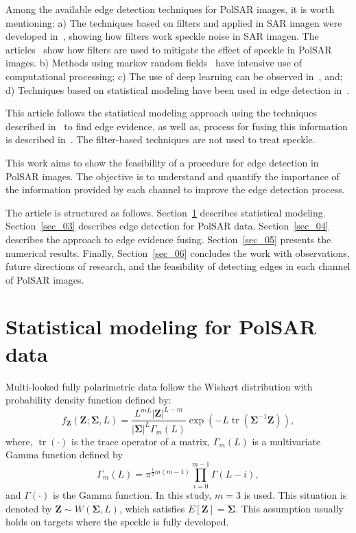 \documentclass[journal]{IEEEtran}
\DeclareMathOperator{\traco}{tr}
\begin{document}
Among the available edge detection techniques for PolSAR images, it is worth mentioning:
a) The techniques based on filters and applied in SAR imagen were developed in~\cite{tlb, obw, flmc}, showing how filters work speckle noise in SAR imagen. The articles~\cite{sjx, lzly, wxbzw, law, cgaf} show how filters are used to mitigate the effect of speckle in PolSAR images.   
b) Methods using markov random fields~\cite{bf} have intensive use of computational processing;
c) The use of deep learning can be observed in~\cite{bac, ztmxzxf}, and;
d) Techniques based on statistical modeling have been used in edge detection in~\cite{gmbf, fbgm, horrit}.

This article follows the statistical modeling approach using the techniques described in~\cite{fbgm, nhfc, bmf_2019} to find edge evidence, as well as, process for fusing this information is described in~\cite{mit, sg}. The filter-based techniques are not used to treat speckle. 

This work aims to show the feasibility of a procedure for edge detection in PolSAR images. The objective is to understand and quantify the importance of the information provided by each channel to improve the edge detection process.

The article is structured as follows.
Section~\ref{sec_02} describes statistical modeling.
Section~\ref{sec_03} describes edge detection for PolSAR data.
Section~\ref{sec_04} describes the approach to edge evidence fusing.
Section~\ref{sec_05} presents the numerical results.
Finally, Section~\ref{sec_06} concludes the work with observations, future directions of research, and the feasibility of detecting edges in each channel of PolSAR images.

\section{Statistical modeling for PolSAR data}\label{sec_02}
Multi-looked fully polarimetric data follow the Wishart distribution with probability density function defined by:
\begin{equation}
    f_{\mathbf{Z}}(\mathbf{Z};\mathbf{\Sigma},L)=\frac{L^{mL}|\mathbf{Z}|^{L-m}}{|\mathbf{\Sigma}|^{L}\Gamma_m(L)} \exp(-L\traco(\mathbf{\Sigma}^{-1}\mathbf{Z})),
    \label{eq_04}
\end{equation} 
where, $\traco(\cdot)$ is the trace operator of a matrix, $\Gamma_m(L)$ is a multivariate Gamma function defined by
\begin{equation*}
	\Gamma_m(L)=\pi^{\frac{1}{2}m(m-1)} \prod_{i=0}^{m-1}\Gamma(L-i),
\end{equation*}
and $\Gamma(\cdot)$ is the Gamma function.
In this study, $m=3$ is used. 
This situation is denoted by $\mathbf{Z}\sim W(\mathbf{\Sigma}, L)$, which satisfies $E[\mathbf{Z}]=\mathbf{\Sigma}$. 
This assumption usually holds on targets where the speckle is fully developed.
\end{document}
